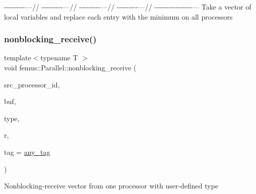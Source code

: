 -\/-\/-\/-\/-\/-\/-\/-\/-\/---// -\/-\/-\/-\/-\/-\/-\/-\/-\/---// -\/-\/-\/-\/-\/-\/-\/-\/-\/---// -\/-\/-\/-\/-\/-\/-\/-\/-\/---// -\/-\/-\/-\/-\/-\/-\/-\/-\/-\/-\/-\/-\/-\/-\/-\/--- Take a vector of local variables and replace each entry with the minimum on all processors \mbox{\label{namespacefemus_1_1_parallel_ab43a0be42a037601024dba3d07f43721}} 
\subsubsection{\texorpdfstring{nonblocking\+\_\+receive()}{nonblocking\_receive()}\hspace{0.1cm}{\footnotesize\ttfamily [1/2]}}
{\footnotesize\ttfamily template$<$typename T $>$ \\
void femus\+::\+Parallel\+::nonblocking\+\_\+receive (\begin{DoxyParamCaption}\item[{const int}]{src\+\_\+processor\+\_\+id,  }\item[{std\+::vector$<$ T $>$ \&}]{buf,  }\item[{const \mbox{\hyperlink{classfemus_1_1_parallel_1_1_data_type}{Data\+Type}} \&}]{type,  }\item[{\mbox{\hyperlink{structfemus_1_1_parallel_1_1request}{request}} \&}]{r,  }\item[{const int}]{tag = {\ttfamily \mbox{\hyperlink{namespacefemus_1_1_parallel_a928996065f46cb52e89e132cdcb30328}{any\+\_\+tag}}} }\end{DoxyParamCaption})\hspace{0.3cm}{\ttfamily [inline]}}

Nonblocking-\/receive vector from one processor with user-\/defined type \mbox{\label{namespacefemus_1_1_parallel_a6fc899af0b0588c9f0827e1a5e1fe8f1}} 
